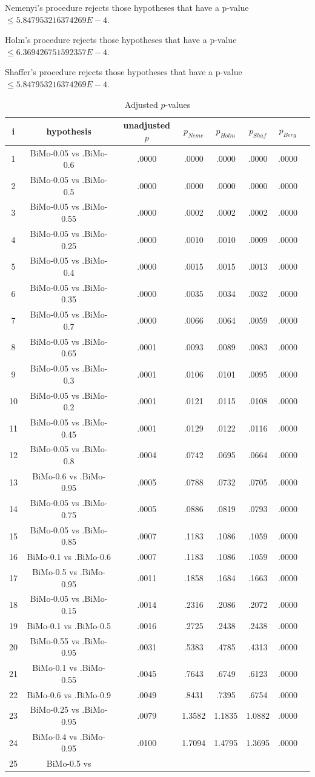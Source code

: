 \documentclass[a4paper,10pt]{article}
\begin{document}
\begin{landscape}
\begin{table}[!htp]
\begin{tabular}{cccccc}
\end{tabular}
\end{table}
Nemenyi's procedure rejects those hypotheses that have a p-value $\le5.847953216374269E-4$.


Holm's procedure rejects those hypotheses that have a p-value $\le6.369426751592357E-4$.


Shaffer's procedure rejects those hypotheses that have a p-value $\le5.847953216374269E-4$.


\begin{table}[!htp]
\centering\tiny
\caption{Adjusted $p$-values}
\begin{tabular}{cccccccc}
i&hypothesis&unadjusted $p$&$p_{Neme}$&$p_{Holm}$&$p_{Shaf}$&$p_{Berg}$\\
\hline
1&BiMo-0.05 vs .BiMo-0.6&.0000&.0000&.0000&.0000&.0000\\2&BiMo-0.05 vs .BiMo-0.5&.0000&.0000&.0000&.0000&.0000\\3&BiMo-0.05 vs .BiMo-0.55&.0000&.0002&.0002&.0002&.0000\\4&BiMo-0.05 vs .BiMo-0.25&.0000&.0010&.0010&.0009&.0000\\5&BiMo-0.05 vs .BiMo-0.4&.0000&.0015&.0015&.0013&.0000\\6&BiMo-0.05 vs .BiMo-0.35&.0000&.0035&.0034&.0032&.0000\\7&BiMo-0.05 vs .BiMo-0.7&.0000&.0066&.0064&.0059&.0000\\8&BiMo-0.05 vs .BiMo-0.65&.0001&.0093&.0089&.0083&.0000\\9&BiMo-0.05 vs .BiMo-0.3&.0001&.0106&.0101&.0095&.0000\\10&BiMo-0.05 vs .BiMo-0.2&.0001&.0121&.0115&.0108&.0000\\11&BiMo-0.05 vs .BiMo-0.45&.0001&.0129&.0122&.0116&.0000\\12&BiMo-0.05 vs .BiMo-0.8&.0004&.0742&.0695&.0664&.0000\\13&BiMo-0.6 vs .BiMo-0.95&.0005&.0788&.0732&.0705&.0000\\14&BiMo-0.05 vs .BiMo-0.75&.0005&.0886&.0819&.0793&.0000\\15&BiMo-0.05 vs .BiMo-0.85&.0007&.1183&.1086&.1059&.0000\\16&BiMo-0.1 vs .BiMo-0.6&.0007&.1183&.1086&.1059&.0000\\17&BiMo-0.5 vs .BiMo-0.95&.0011&.1858&.1684&.1663&.0000\\18&BiMo-0.05 vs .BiMo-0.15&.0014&.2316&.2086&.2072&.0000\\19&BiMo-0.1 vs .BiMo-0.5&.0016&.2725&.2438&.2438&.0000\\20&BiMo-0.55 vs .BiMo-0.95&.0031&.5383&.4785&.4313&.0000\\21&BiMo-0.1 vs .BiMo-0.55&.0045&.7643&.6749&.6123&.0000\\22&BiMo-0.6 vs .BiMo-0.9&.0049&.8431&.7395&.6754&.0000\\23&BiMo-0.25 vs .BiMo-0.95&.0079&1.3582&1.1835&1.0882&.0000\\24&BiMo-0.4 vs .BiMo-0.95&.0100&1.7094&1.4795&1.3695&.0000\\25&BiMo-0.5 vs 
\end{tabular}
\end{table}
\end{landscape}
\end{document}
